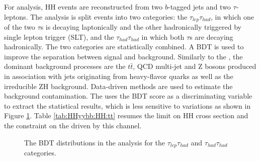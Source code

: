 For \bbtt analysis, HH events are reconstructed from two $b$-tagged jets and two $\tau$-leptons. The analysis is split events into two categories: the $\tau_{lep}\tau_{had}$, in which one of the two $\tau$s is decaying laptonically and the other hadronically triggered by single lepton trigger (SLT), and the $\tau_{had}\tau_{had}$ in which both $\tau$s are decaying hadronically. The two categories are statistically combined. A BDT is used to improve the separation between signal and background. Similarly to the \bbbb, the dominant background processes are the $t\bar{t}$, QCD multi-jet and Z bosons produced in association with jets originating from heavy-flavor quarks as well as the irreducible ZH background. Data-driven methods are used to estimate the background contamination. The \bbtt uses the BDT score as a discriminating variable to extract the statistical results, which is less sensitive to \kl variations as shown in Figure \ref{fig:HHyybb:HH:tt}. Table \ref{tab:HHyybb:HH:tt} resumes the limit on HH cross section and the constraint on the \kl driven by this channel.

\begin{figure}[htbp]
    \centering
    \caption{The BDT distributions in the \bbtt analysis for the $\tau_{lep}\tau_{had}$ and $\tau_{had}\tau_{had}$ categories.}
    \label{fig:HHyybb:HH:tt}
\end{figure}

